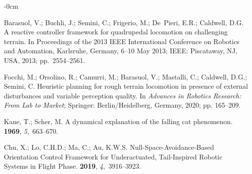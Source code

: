 \documentclass[sensors,article,accept,pdftex,moreauthors]{Definitions/mdpi}
\begin{document}
\begin{adjustwidth}{-\extralength}{0cm}



\begin{thebibliography}{999}

Barasuol, V.; Buchli, J.; Semini, C.; Frigerio, M.; De~Pieri, E.R.; Caldwell,
  D.G.
\newblock A reactive controller framework for quadrupedal locomotion on
  challenging terrain.
\newblock In Proceedings of the 2013 IEEE International Conference on Robotics
  and Automation, Karlsruhe, Germany, 6--10 May 2013; %
 IEEE: Piscataway, NJ, USA,  2013; pp.~2554--2561.

Focchi, M.; Orsolino, R.; Camurri, M.; Barasuol, V.; Mastalli, C.; Caldwell,
  D.G.; Semini, C.
\newblock Heuristic planning for rough terrain locomotion in presence of
  external disturbances and variable perception quality. In {\em Advances in
  Robotics Research: From Lab to Market}; Springer: Berlin/Heidelberg, Germany, %
  2020; pp. 165--209.

Kane, T.; Scher, M.
\newblock A dynamical explanation of the falling cat phenomenon.
 {\bf 1969}, {\em
  5},~663--670.

Chu, X.; Lo, C.H.D.; Ma, C.; Au, K.W.S.
\newblock Null-Space-Avoidance-Based Orientation Control Framework for
  Underactuated, Tail-Inspired Robotic Systems in Flight Phase.
 {\bf 2019}, {\em
  4},~3916--3923.


\end{thebibliography}
\end{adjustwidth}
\end{document}

